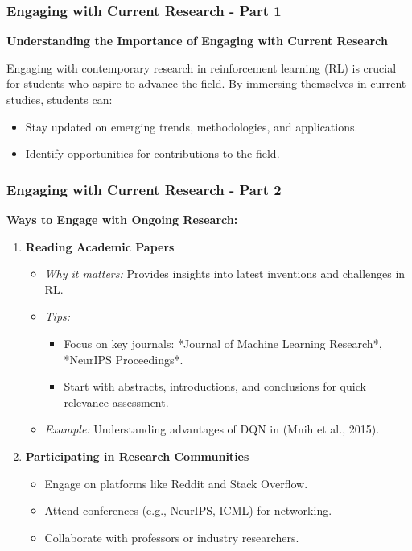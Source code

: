 \documentclass[aspectratio=169]{beamer}
\begin{document}
\begin{frame}[fragile]
    \frametitle{Engaging with Current Research - Part 1}
    \textbf{Understanding the Importance of Engaging with Current Research}
    
    Engaging with contemporary research in reinforcement learning (RL) is crucial for students who aspire to advance the field. By immersing themselves in current studies, students can:
    \begin{itemize}
        \item Stay updated on emerging trends, methodologies, and applications.
        \item Identify opportunities for contributions to the field.
    \end{itemize}
\end{frame}

\begin{frame}[fragile]
    \frametitle{Engaging with Current Research - Part 2}
    
    \textbf{Ways to Engage with Ongoing Research:}
    
    \begin{enumerate}
        \item \textbf{Reading Academic Papers}
        \begin{itemize}
            \item \textit{Why it matters:} Provides insights into latest inventions and challenges in RL.
            \item \textit{Tips:}
            \begin{itemize}
                \item Focus on key journals: *Journal of Machine Learning Research*, *NeurIPS Proceedings*.
                \item Start with abstracts, introductions, and conclusions for quick relevance assessment.
            \end{itemize}
            \item \textit{Example:} Understanding advantages of DQN in (Mnih et al., 2015).
        \end{itemize}
        
        \item \textbf{Participating in Research Communities}
        \begin{itemize}
            \item Engage on platforms like Reddit and Stack Overflow.
            \item Attend conferences (e.g., NeurIPS, ICML) for networking.
            \item Collaborate with professors or industry researchers.
        \end{itemize}
    \end{enumerate}
\end{frame}
\end{document}
